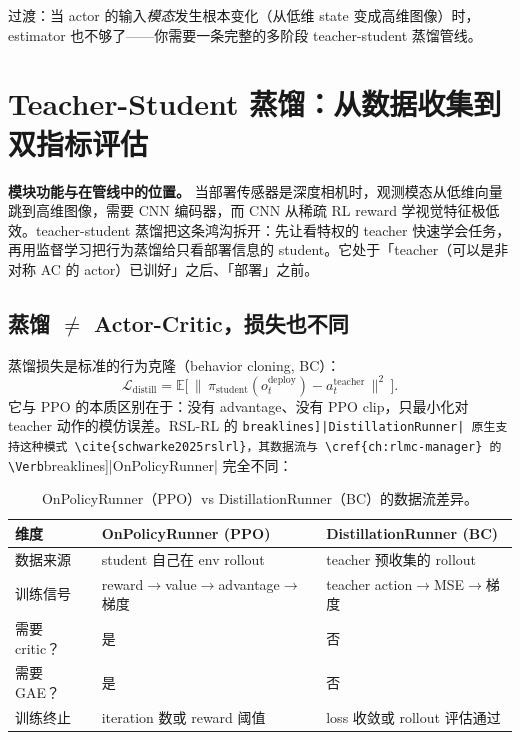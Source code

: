 过渡：当 actor 的输入\emph{模态}发生根本变化（从低维 state 变成高维图像）时，estimator 也不够了——你需要一条完整的多阶段 teacher-student 蒸馏管线。

\section{Teacher-Student 蒸馏：从数据收集到双指标评估}
\label{sec:rlmc-priv-distill}

\textbf{模块功能与在管线中的位置。} 当部署传感器是深度相机时，观测模态从低维向量跳到高维图像，需要 CNN 编码器，而 CNN 从稀疏 RL reward 学视觉特征极低效。teacher-student 蒸馏把这条鸿沟拆开：先让看特权的 teacher 快速学会任务，再用监督学习把行为蒸馏给只看部署信息的 student。它处于「teacher（可以是非对称 AC 的 actor）已训好」之后、「部署」之前。

\subsection{蒸馏 \texorpdfstring{$\ne$}{!=} Actor-Critic，损失也不同}
\label{sec:rlmc-priv-distillvsac}

蒸馏损失是标准的行为克隆（behavior cloning, BC）：
\begin{equation}
\mathcal{L}_{\text{distill}} = \mathbb{E}\Big[\,\big\lVert\, \pi_{\text{student}}(o_t^{\text{deploy}}) - a_t^{\text{teacher}}\,\big\rVert^2\,\Big].
\label{eq:rlmc-priv-distill-loss}
\end{equation}
它与 PPO 的本质区别在于：没有 advantage、没有 PPO clip，只最小化对 teacher 动作的模仿误差。RSL-RL 的 \Verb[breaklines]|DistillationRunner| 原生支持这种模式 \cite{schwarke2025rslrl}，其数据流与 \cref{ch:rlmc-manager} 的 \Verb[breaklines]|OnPolicyRunner| 完全不同：

\begin{table}[H]
\centering
\small
\caption{OnPolicyRunner（PPO）vs DistillationRunner（BC）的数据流差异。}
\label{tab:rlmc-priv-runners}
\begin{tabular}{@{}lll@{}}
\toprule
维度 & OnPolicyRunner (PPO) & DistillationRunner (BC) \\
\midrule
数据来源 & student 自己在 env rollout & teacher 预收集的 rollout \\
训练信号 & reward$\to$value$\to$advantage$\to$梯度 & teacher action$\to$MSE$\to$梯度 \\
需要 critic？ & 是 & 否 \\
需要 GAE？ & 是 & 否 \\
训练终止 & iteration 数或 reward 阈值 & loss 收敛或 rollout 评估通过 \\
\bottomrule
\end{tabular}
\end{table}

